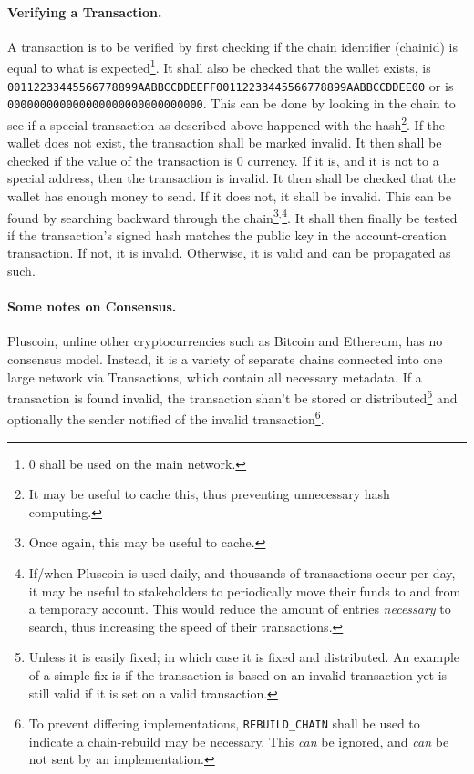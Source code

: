 \documentclass{article}
\begin{document}
\paragraph{Verifying a Transaction.} A transaction is to be verified by first
checking if the chain identifier (chainid) is equal to what is
expected\footnote{$0$ shall be used on the main network.}. It shall also be
checked that the wallet exists, is
{\texttt{00112233445566778899AABBCCDDEE\-FF00112233445566778899AABBCCDDEE00}}
or is
{\texttt{000000000000000000000000000000}}.
This can be done by looking in the chain to see if a special transaction
as described above happened with the hash\footnote{It may be useful to cache
this, thus preventing unnecessary hash computing.}. If the wallet does not
exist, the transaction shall be marked invalid. It then shall be checked if the
value of the transaction is 0 currency. If it is, and it is not to
a special address, then the transaction is invalid. It then shall be checked
that the wallet has enough money to send. If it does not, it shall be invalid.
This can be found by searching backward through the chain\footnote{Once
again, this may be useful to cache.}$^,$\footnote{If/when Pluscoin is used
daily, and thousands of transactions occur per day, it may be useful to
stakeholders to periodically move their funds to and from a temporary account.
This would reduce the amount of entries {\it{necessary}} to search, thus
increasing the speed of their transactions.}. It shall then finally be tested
if the transaction's signed hash matches the public key in the account-creation
transaction. If not, it is invalid. Otherwise, it is valid and can be
propagated as such.

\paragraph{Some notes on Consensus.} Pluscoin, unline other cryptocurrencies
such as Bitcoin and Ethereum, has no consensus model. Instead, it is a variety
of separate chains connected into one large network via Transactions,
which contain all necessary metadata. If a transaction is found invalid, the
transaction shan't be stored or distributed\footnote{Unless it is easily fixed;
in which case it is fixed and distributed. An example of a simple fix is if the
transaction is based on an invalid transaction yet is still valid if it is set
on a valid transaction.} and optionally the sender notified of the invalid
transaction\footnote {To prevent differing implementations,
\texttt{REBUILD\_CHAIN} shall be used to indicate a chain-rebuild may be
necessary. This {\it{can}} be ignored, and {\it{can}} be not sent by an
implementation.}.
\end{document}
